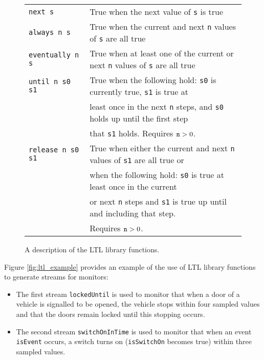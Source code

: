 \begin{figure*}[!htb]
\begin{tabular}{l l}
\verb,next s, & True when the next value of \verb,s, is true\\
\verb,always n s, & True when the current and next \verb,n,
                    values of \verb,s, are all true\\
\verb,eventually n s, & True when at least one of the current or
                        next \verb,n, values of \verb,s, are all true\\
\verb,until n s0 s1, & True when the following hold:
                       \verb,s0, is currently true, \verb,s1,
                       is true at\\
                     & least once in the next \verb,n, steps,
                       and \verb,s0, holds up until the first step\\
                     & that \verb,s1, holds. Requires $\verb,n, > 0$.\\
\verb,release n s0 s1, & True when either the current and next \verb,n,
                         values of \verb,s1, are all true or\\
                       & when the following hold: \verb,s0, is true at
                         least once in the current\\
                       & or next \verb,n, steps and \verb,s1, is
                         true up until and including that step.\\
                       & Requires $\verb,n, > 0$.\
\end{tabular}
\caption{A description of the LTL library functions.}
\label{fig:ltl_desc}
\end{figure*}

Figure \ref{fig:ltl_example} provides an example of the use of LTL library functions
to generate streams for monitors:

\begin{itemize}
\item The first stream \verb,lockedUntil, is used to monitor that
when a door of a vehicle is signalled to be opened, the vehicle
stops within four sampled values and that the doors remain locked
until this stopping occurs.

\item The second stream \verb,switchOnInTime, is used to monitor that
when an event \verb,isEvent, occurs, a switch turns on (\verb,isSwitchOn,
becomes true) within three sampled values.
\end{itemize}

